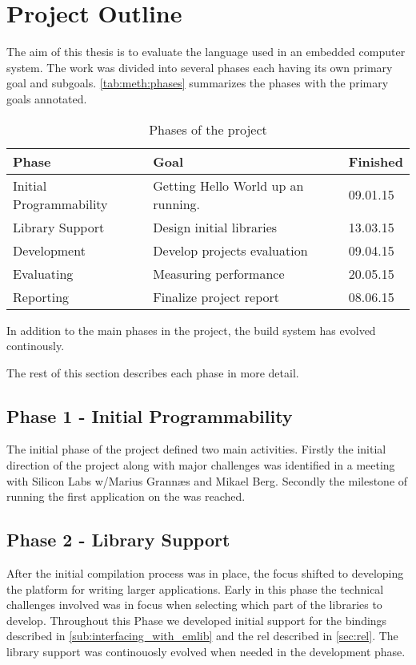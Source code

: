 \section{Project Outline}
\label{sec:project-outline}

The aim of this thesis is to evaluate the {\rust} language used in an embedded computer system.
The work was divided into several phases each having its own primary goal and subgoals.
\autoref{tab:meth:phases} summarizes the phases with the primary goals annotated.

\begin{table}[H]
  \centering
  \begin{tabular}{l|l|l}
    \textbf{Phase}&\textbf{Goal}&\textbf{Finished} \\
    \hline
    Initial Programmability & Getting Hello World up an running. & 09.01.15\\
    Library Support & Design initial libraries & 13.03.15\\
    Development & Develop projects evaluation &  09.04.15 \\
    Evaluating & Measuring performance & 20.05.15 \\
    Reporting & Finalize project report & 08.06.15\\
    \hline
  \end{tabular}
  \caption{Phases of the project}
  \label{tab:meth:phases}
\end{table}

In addition to the main phases in the project, the build system has evolved continously.

The rest of this section describes each phase in more detail.

\subsection{Phase 1 - Initial Programmability}
The initial phase of the project defined two main activities.
Firstly the initial direction of the project along with major challenges was identified in a meeting with Silicon Labs w/Marius Grannæs and Mikael Berg.
Secondly the milestone of running the first {\rust} application on the {\gecko} was reached.


\subsection{Phase 2 - Library Support}

After the initial compilation process was in place, the focus shifted to developing the platform for writing larger applications.
Early in this phase the technical challenges involved was in focus when selecting which part of the libraries to develop.
Throughout this Phase we developed initial support for the bindings described in \autoref{sub:interfacing_with_emlib} and the \gls{rel} described in \autoref{sec:rel}.
The library support was continouosly evolved when needed in the development phase.

